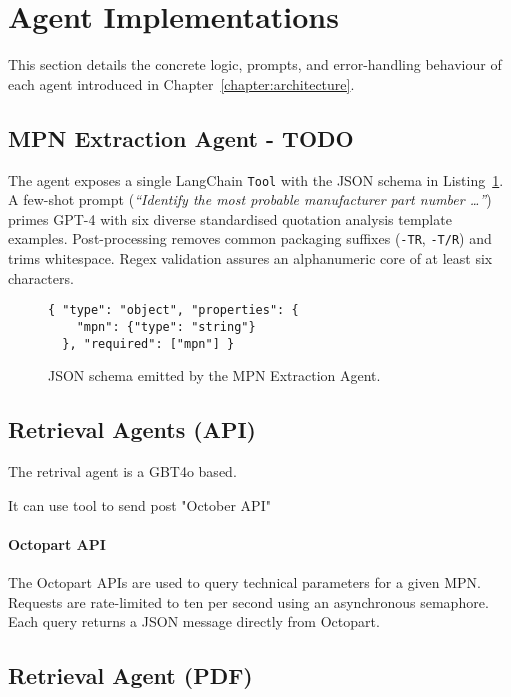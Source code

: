 \section{Agent Implementations}
This section details the concrete logic, prompts, and error-handling behaviour of each agent introduced in Chapter~\ref{chapter:architecture}.

\subsection{MPN Extraction Agent - TODO}
The agent exposes a single LangChain \texttt{Tool} with the JSON schema in Listing~\ref{lst:mpn_schema}.  A few-shot prompt (\emph{``Identify the most probable manufacturer part number …''}) primes GPT-4 with six diverse standardised quotation analysis template examples.  Post-processing removes common packaging suffixes (\texttt{-TR}, \texttt{-T/R}) and trims whitespace.  Regex validation assures an alphanumeric core of at least six characters.
\begin{figure}[H]
\centering
\begin{minipage}{0.9\textwidth}
\begin{verbatim}
{ "type": "object", "properties": {
    "mpn": {"type": "string"}
  }, "required": ["mpn"] }
\end{verbatim}
\end{minipage}
\caption{JSON schema emitted by the MPN Extraction Agent.}
\label{lst:mpn_schema}
\end{figure}

\subsection{Retrieval Agents (API)}
The retrival agent is a GBT4o based.

It can use tool to send post "October API"

\paragraph{Octopart API}  The Octopart APIs are used to query technical parameters for a given MPN. Requests are rate-limited to ten per second using an asynchronous semaphore. Each query returns a JSON message directly from Octopart.


\subsection{Retrieval Agent (PDF)}

